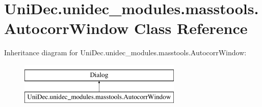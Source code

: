 \hypertarget{class_uni_dec_1_1unidec__modules_1_1masstools_1_1_autocorr_window}{}\section{Uni\+Dec.\+unidec\+\_\+modules.\+masstools.\+Autocorr\+Window Class Reference}
\label{class_uni_dec_1_1unidec__modules_1_1masstools_1_1_autocorr_window}
Inheritance diagram for Uni\+Dec.\+unidec\+\_\+modules.\+masstools.\+Autocorr\+Window\+:\begin{figure}[H]
\begin{center}
\leavevmode
\includegraphics[height=2.000000cm]{class_uni_dec_1_1unidec__modules_1_1masstools_1_1_autocorr_window}
\end{center}
\end{figure}
